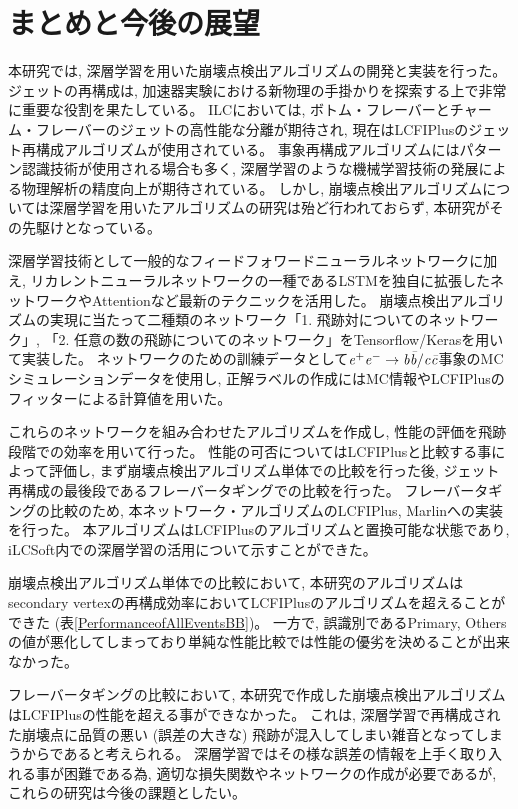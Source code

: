 
\chapter{まとめと今後の展望} \label{chap:Conclusion}

本研究では, 深層学習を用いた崩壊点検出アルゴリズムの開発と実装を行った。
ジェットの再構成は, 加速器実験における新物理の手掛かりを探索する上で非常に重要な役割を果たしている。
ILCにおいては, ボトム・フレーバーとチャーム・フレーバーのジェットの高性能な分離が期待され, 現在はLCFIPlusのジェット再構成アルゴリズムが使用されている。
事象再構成アルゴリズムにはパターン認識技術が使用される場合も多く, 深層学習のような機械学習技術の発展による物理解析の精度向上が期待されている。
しかし, 崩壊点検出アルゴリズムについては深層学習を用いたアルゴリズムの研究は殆ど行われておらず, 本研究がその先駆けとなっている。

深層学習技術として一般的なフィードフォワードニューラルネットワークに加え, リカレントニューラルネットワークの一種であるLSTMを独自に拡張したネットワークやAttentionなど最新のテクニックを活用した。
崩壊点検出アルゴリズムの実現に当たって二種類のネットワーク「1. 飛跡対についてのネットワーク」, 「2. 任意の数の飛跡についてのネットワーク」をTensorflow/Kerasを用いて実装した。
ネットワークのための訓練データとして$\it e^+e^- \to b \bar{b}/c \bar{c}$事象のMCシミュレーションデータを使用し, 正解ラベルの作成にはMC情報やLCFIPlusのフィッターによる計算値を用いた。

これらのネットワークを組み合わせたアルゴリズムを作成し, 性能の評価を飛跡段階での効率を用いて行った。
性能の可否についてはLCFIPlusと比較する事によって評価し, まず崩壊点検出アルゴリズム単体での比較を行った後, ジェット再構成の最後段であるフレーバータギングでの比較を行った。
フレーバータギングの比較のため, 本ネットワーク・アルゴリズムのLCFIPlus, Marlinへの実装を行った。
本アルゴリズムはLCFIPlusのアルゴリズムと置換可能な状態であり, iLCSoft内での深層学習の活用について示すことができた。

崩壊点検出アルゴリズム単体での比較において, 本研究のアルゴリズムはsecondary vertexの再構成効率においてLCFIPlusのアルゴリズムを超えることができた (表\ref{PerformanceofAllEventsBB})。
一方で, 誤識別であるPrimary, Othersの値が悪化してしまっており単純な性能比較では性能の優劣を決めることが出来なかった。

フレーバータギングの比較において, 本研究で作成した崩壊点検出アルゴリズムはLCFIPlusの性能を超える事ができなかった。
これは, 深層学習で再構成された崩壊点に品質の悪い (誤差の大きな) 飛跡が混入してしまい雑音となってしまうからであると考えられる。
深層学習ではその様な誤差の情報を上手く取り入れる事が困難である為, 適切な損失関数やネットワークの作成が必要であるが, これらの研究は今後の課題としたい。\\

